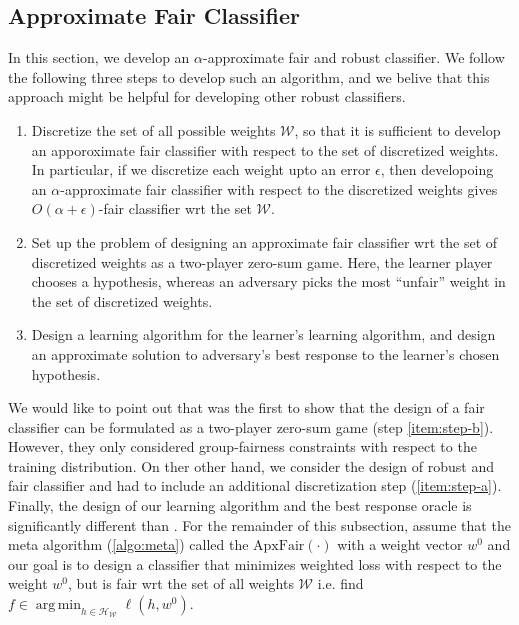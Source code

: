 \documentclass{article}
\DeclareMathOperator*{\argmin}{arg\,min}
\newcommand{\WW}{\mathcal{W}}
\newcommand{\HH}{\mathcal{H}}
\newcommand{\AF}{\textrm{ApxFair}}
\begin{document}
\subsection{Approximate Fair Classifier}
In this section, we develop an $\alpha$-approximate fair and robust classifier. We follow the following three steps to develop such an algorithm, and we belive that this approach might be helpful for developing other robust classifiers.
\begin{enumerate}
\item \label{item:step-a} Discretize the set of all possible weights $\WW$, so that it is sufficient to develop an apporoximate fair classifier with respect to the set of discretized weights. In particular, if we discretize each weight upto an error $\epsilon$, then developoing an $\alpha$-approximate fair classifier with respect to the discretized weights gives $O(\alpha + \epsilon)$-fair classifier wrt the set $\WW$.
\item \label{item:step-b} Set up the problem of designing an approximate fair classifier wrt the set of discretized weights as a two-player zero-sum game. Here, the learner player chooses a hypothesis, whereas an adversary picks the most ``unfair'' weight in the set of discretized weights.
\item \label{item:step-c} Design a learning algorithm for the learner's learning algorithm, and design an approximate solution to adversary's best response to the learner's chosen hypothesis.
\end{enumerate}
We would like to point out that \cite{ABDL+18} was the first to show that the design of a fair classifier can be formulated as a two-player zero-sum game (step \ref{item:step-b}). However, they only considered  group-fairness constraints with respect to the training distribution. On ther other hand, we consider the design of robust and fair classifier and had to include an additional discretization step (\ref{item:step-a}). Finally, the design of our learning algorithm and the best response oracle is significantly different than \cite{ABDL+18,KNRZ17}. For the remainder of this subsection, assume that the meta algorithm (\ref{algo:meta}) called the $\AF(\cdot)$ with a weight vector $w^0$ and our goal is to design a classifier that minimizes weighted loss with respect to the weight $w^0$, but is fair wrt the set of all weights $\WW$ i.e. find $f \in \argmin_{h \in \HH_{\WW} }\ell(h,w^0)$.
\end{document}
